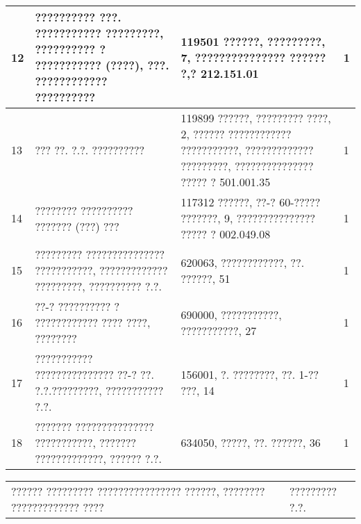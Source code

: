\documentclass[12pt,openany,a4paper]{article}
\begin{document}
\thispagestyle{empty}
\newpage
\thispagestyle{empty}

\noindent
\begin{tabular}{|p{2cm}|p{5cm}|p{6cm}|p{2cm}|}
\hline
12 & ?????????? ???. ??????????? ?????????, ?????????? ? ??????????? (????),
???. ???????????? ?????????? & 119501 ??????, ?????????, 7, ???????????????
?????? ?,? 212.151.01 & 1\\
\hline
13 & ??? ??. ?.?. ?????????? & 119899 ??????, ????????? ????, 2, ??????
???????????? ???????????, ????????????? ?????????, ???????????????
????? ? 501.001.35 & 1\\
\hline
14 & ???????? ?????????? ??????? (???) ??? & 117312 ??????, ??-? 60-?????
???????, 9, ??????????????? ????? ? 002.049.08 & 1\\
\hline
15 & ????????? ??????????????? ???????????, ????????????? ?????????,
?????????? ?.?. & 620063, ????????????, ??. ??????, 51 & 1\\
\hline
16 & ??-? ?????????? ? ???????????? ???? ????, ???????? &
690000, ???????????, ???????????, 27 & 1\\
\hline
17 & ??????????? ??????????????? ??-? ??. ?.?.?????????, ??????????? ?.?. &
156001, ?. ????????, ??. 1-?? ???, 14 & 1\\
\hline
18 & ??????? ??????????????? ???????????, ??????? ?????????????, ?????? ?.?. &
634050, ?????, ??. ??????, 36 & 1\\
\hline
\end{tabular}

\bigskip

\noindent
\begin{tabular}{p{4cm}p{6cm}p{4cm}}
?????? ????????? ???????????????? ??????, ???????? ????????????? ???? &&
????????? ?.?.
\end{tabular}
\end{document}
